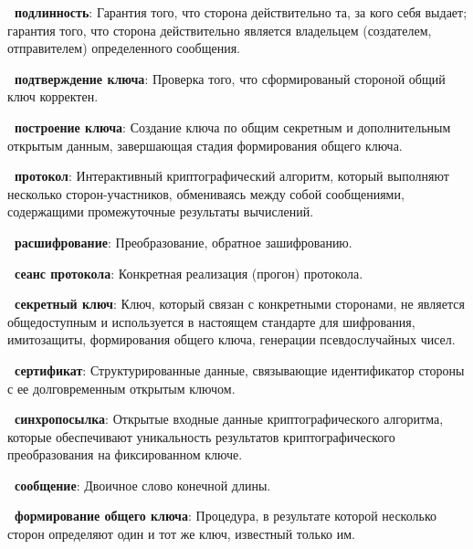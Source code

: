 

{\bf \thedefctr~подлинность}:
Гарантия того, что сторона действительно та, за кого себя выдает; гарантия того,
что сторона действительно является владельцем (создателем, отправителем)
определенного сообщения.

{\bf \thedefctr~подтверждение ключа}:
Проверка того, что сформированый стороной общий ключ корректен.

{\bf \thedefctr~построение ключа}:
Создание ключа по общим секретным и дополнительным открытым данным, завершающая
стадия формирования общего ключа.

{\bf \thedefctr~протокол}:
Интерактивный криптографический алгоритм, который выполняют несколько
сторон-участников, обмениваясь между собой сообщениями, содержащими
промежуточные результаты вычислений.

{\bf \thedefctr~расшифрование}:
Преобразование, обратное зашифрованию.

{\bf \thedefctr~сеанс протокола}:
Конкретная реализация (прогон) протокола.

{\bf \thedefctr~секретный ключ}:
Ключ, который связан с конкретными сторонами,
не является общедоступным и используется в настоящем стандарте 
для шифрования, имитозащиты, формирования общего ключа,
генерации псевдослучайных чисел.

{\bf \thedefctr~сертификат}:
Структурированные данные, связывающие 
идентификатор стороны с ее долговременным открытым ключом.

{\bf \thedefctr~синхропосылка}:
Открытые входные данные криптографического алгоритма,
которые обеспечивают уникальность результатов 
криптографического преобразования на фиксированном ключе.

{\bf \thedefctr~сообщение}:
Двоичное слово конечной длины.

{\bf \thedefctr~формирование общего ключа}:
Процедура, в результате которой несколько сторон
определяют один и тот же ключ, известный только им.

